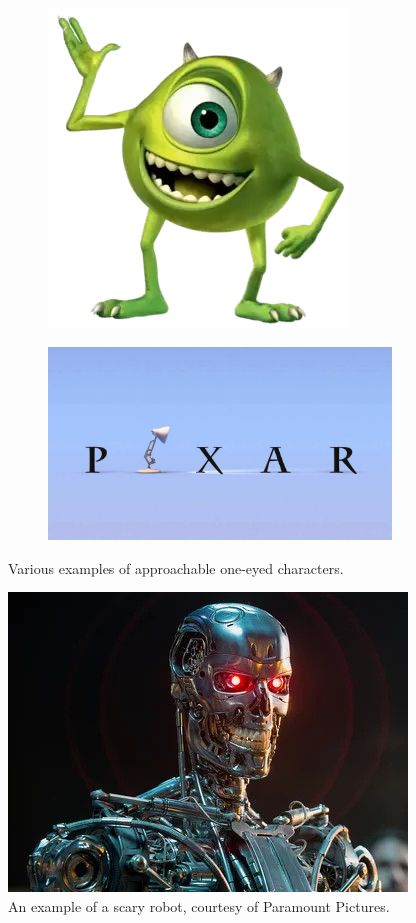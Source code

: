 \begin{figure}[h]
\begin{subfigure}{0.2\textwidth}
    \includegraphics[width=\textwidth]{Thesis/ch1/Mike_Wazowski.png}
    \label{fig:second}
\end{subfigure}
\hfill
\begin{subfigure}{0.4\textwidth}
    \includegraphics[width=\textwidth]{Thesis/ch1/pixar_lamp.jpg}
    \label{fig:third}
\end{subfigure}
\caption{Various examples of approachable one-eyed characters.}
\label{fig:one-eye}
\end{figure}
\begin{figure}[h]
    \centering
    \includegraphics[width=0.5\linewidth]{Thesis/ch1/terminator.jpg}
    \caption{An example of a scary robot, courtesy of Paramount Pictures.}
    \label{fig:terminator}
\end{figure}